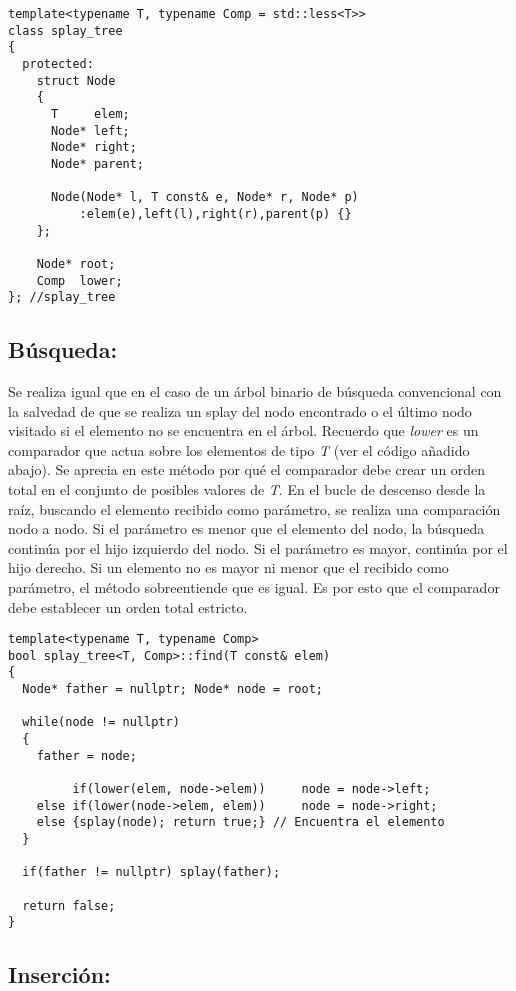 \documentclass[letterpaper,12pt]{article}
\begin{document}
\begin{lstlisting}
template<typename T, typename Comp = std::less<T>>
class splay_tree
{
  protected:
    struct Node
    {
      T     elem;
      Node* left;
      Node* right;
      Node* parent;

      Node(Node* l, T const& e, Node* r, Node* p) 
          :elem(e),left(l),right(r),parent(p) {}
    };

    Node* root;
    Comp  lower;
}; //splay_tree
\end{lstlisting}
\subsection{Búsqueda:}

Se realiza igual que en el caso de un árbol binario de búsqueda convencional 
con la salvedad de que se realiza un splay del nodo encontrado o el último 
nodo visitado si el elemento no se encuentra en el árbol. Recuerdo que 
\textit{lower} es un comparador que actua sobre los elementos de tipo 
\textit{T} (ver el código añadido abajo). Se aprecia en este método por qué el 
comparador debe crear un orden total en el conjunto de posibles valores de 
\textit{T}. En el bucle de descenso desde la raíz, buscando el elemento 
recibido como parámetro, se realiza una comparación nodo a nodo. Si el 
parámetro es menor que el elemento del nodo, la búsqueda continúa por el hijo 
izquierdo del nodo. Si el parámetro es mayor, continúa por el hijo derecho. Si 
un elemento no es mayor ni menor que el recibido como parámetro, el método 
sobreentiende que es igual. Es por esto que el comparador debe establecer un 
orden total estricto. 

\begin{lstlisting}
template<typename T, typename Comp>
bool splay_tree<T, Comp>::find(T const& elem)
{
  Node* father = nullptr; Node* node = root;

  while(node != nullptr)
  {
    father = node;

         if(lower(elem, node->elem))     node = node->left;
    else if(lower(node->elem, elem))     node = node->right;
    else {splay(node); return true;} // Encuentra el elemento
  }

  if(father != nullptr) splay(father);

  return false;
}
\end{lstlisting}
\subsection{Inserción:}
\end{document}
